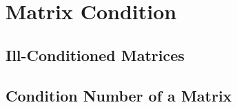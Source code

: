 \section{Matrix Condition}

	\subsection{Ill-Conditioned Matrices}

	\subsection{Condition Number of a Matrix}
